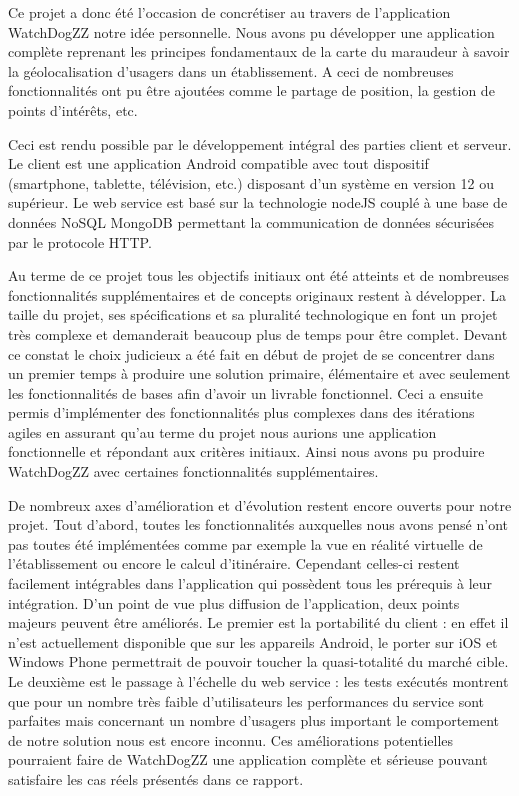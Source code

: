 
Ce projet a donc été l’occasion de concrétiser au travers de l’application WatchDogZZ notre idée personnelle. Nous avons pu développer une application complète reprenant les principes fondamentaux de la carte du maraudeur à savoir la géolocalisation d’usagers dans un établissement. A ceci de nombreuses fonctionnalités ont pu être ajoutées comme le partage de position, la gestion de points d’intérêts, etc.

Ceci est rendu possible par le développement intégral des parties client et serveur. Le client est une application Android compatible avec tout dispositif (smartphone, tablette, télévision, etc.) disposant d’un système en version 12 ou supérieur. Le web service est basé sur la technologie nodeJS couplé à une base de données NoSQL MongoDB permettant la communication de données sécurisées par le protocole HTTP.

Au terme de ce projet tous les objectifs initiaux ont été atteints et de nombreuses fonctionnalités supplémentaires et de concepts originaux restent à développer. La taille du projet, ses spécifications et sa pluralité technologique en font un projet très complexe et demanderait beaucoup plus de temps pour être complet. Devant ce constat le choix judicieux a été fait en début de projet de se concentrer dans un premier temps à produire une solution primaire, élémentaire et avec seulement les fonctionnalités de bases afin d’avoir un livrable fonctionnel. Ceci a ensuite permis d’implémenter des fonctionnalités plus complexes dans des itérations agiles en assurant qu’au terme du projet nous aurions une application fonctionnelle et répondant aux critères initiaux. Ainsi nous avons pu produire WatchDogZZ avec certaines fonctionnalités supplémentaires.

De nombreux axes d’amélioration et d’évolution restent encore ouverts pour notre projet. Tout d’abord, toutes les fonctionnalités auxquelles nous avons pensé n’ont pas toutes été implémentées comme par exemple la vue en réalité virtuelle de l’établissement ou encore le calcul d’itinéraire. Cependant celles-ci restent facilement intégrables dans l’application qui possèdent tous les prérequis à leur intégration. D’un point de vue plus diffusion de l’application, deux points majeurs peuvent être améliorés. Le premier est la portabilité du client : en effet il n’est actuellement disponible que sur les appareils Android, le porter sur iOS et Windows Phone permettrait de pouvoir toucher la quasi-totalité du marché cible. Le deuxième est le passage à l’échelle du web service : les tests exécutés montrent que pour un nombre très faible d’utilisateurs les performances du service sont parfaites mais concernant un nombre d’usagers plus important le comportement de notre solution nous est encore inconnu. Ces améliorations potentielles pourraient faire de WatchDogZZ une application complète et sérieuse pouvant satisfaire les cas réels présentés dans ce rapport.
